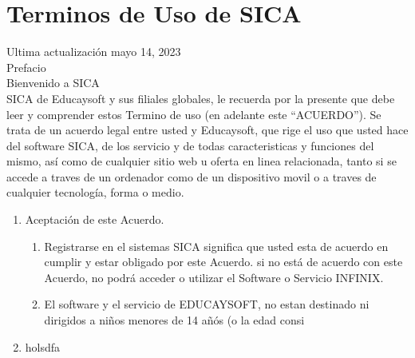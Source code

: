\documentclass[a4paper,12pt,draft]{scrartcl}
\begin{document}
\section{Terminos de Uso de SICA}
\label{sec:terminos-de-uso}
Ultima actualización mayo 14, 2023 \\
Prefacio\\

Bienvenido a SICA \\

SICA de Educaysoft y sus filiales globales, le recuerda por la presente que debe leer y comprender estos Termino de uso (en adelante este ``ACUERDO''). Se trata de un acuerdo legal entre usted y Educaysoft, que rige el uso que usted hace del software SICA, de los servicio y de todas caracteristicas y funciones del mismo, así como de cualquier sitio web u oferta en linea relacionada, tanto si se accede a traves de un ordenador como de un dispositivo movil o a traves de cualquier tecnología, forma o medio.


\begin{enumerate}
\item Aceptación de este Acuerdo.
  \begin{enumerate}
  \item Registrarse en el sistemas SICA significa que usted esta de acuerdo en cumplir y estar obligado por este Acuerdo. si no está de acuerdo con este Acuerdo, no podrá acceder o utilizar el Software o Servicio INFINIX.
  \item El software y el servicio  de EDUCAYSOFT, no estan destinado ni dirigidos a niños menores de 14 añós (o la edad consi
  \end{enumerate}
  
\item holsdfa
  \end{enumerate}
  
  
  
\end{document}
